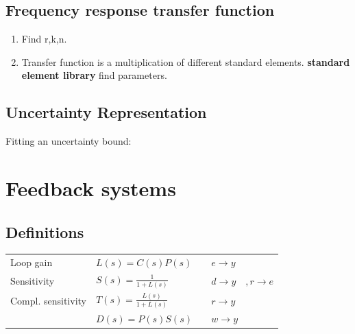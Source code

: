 \documentclass[10pt,a4paper]{scrartcl}
\begin{document}
\begin{multicols*}{3}
	
	
	\subsection{Frequency response \dahe transfer function}
	
	\begin{enumerate}
	\compaq
	\item
	Find r,k,n.
	\item
	Transfer function is a multiplication of different standard elements. \dahe \textbf{standard element library} \dahe find parameters.
	\end{enumerate}
	
	
	
	
	\subsection{Uncertainty Representation}
	
	
	Fitting an uncertainty bound:
	
	
	
	
	
	\section{Feedback systems}
	
	
	
	
	
	\subsection*{Definitions}
	
	\begin{tabular}{lll}
	Loop gain & $L(s)=C(s)P(s)\quad$&$ e\rightarrow y$\\
	Sensitivity & $S(s)=\frac{1}{1+L(s)}$&$ d\rightarrow y\quad, r\rightarrow e$\\
	Compl. sensitivity & $T(s)=\frac{L(s)}{1+L(s)}$&$r\rightarrow y$\\
	&$D(s)=P(s)S(s)$&$w\rightarrow y$
	\end{tabular}
	

\end{multicols*}
\end{document}

